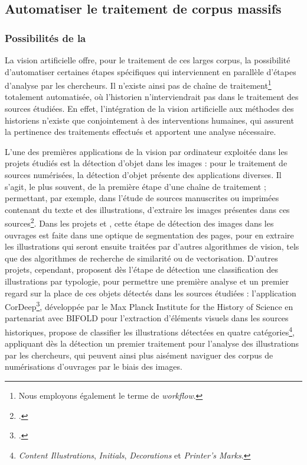 \subsection{Automatiser le traitement de corpus massifs}
    \subsubsection{Possibilités de la \cv}
	La vision artificielle offre, pour le traitement de ces larges corpus, la possibilité d'automatiser certaines étapes spécifiques qui interviennent en parallèle d'étapes d'analyse par les chercheurs. Il n'existe ainsi pas de chaîne de traitement\footnote{Nous employons également le terme de \textit{workflow}.} totalement automatisée, où l'historien n'interviendrait pas dans le traitement des sources étudiées. En effet, l'intégration de la vision artificielle aux méthodes des historiens n'existe que conjointement à des interventions humaines, qui assurent la pertinence des traitements effectués et apportent une analyse nécessaire.
	
	L'une des premières applications de la vision par ordinateur exploitée dans les projets étudiés est la détection d'objet dans les images : pour le traitement de sources numérisées, la détection d'objet présente des applications diverses. Il s'agit, le plus souvent, de la première étape d'une chaîne de traitement ; permettant, par exemple, dans l'étude de sources manuscrites ou imprimées contenant du texte et des illustrations, d'extraire les images présentes dans ces sources\footcite{buttnerCorDeepSacroboscoDataset2022}. Dans les projets \eida et \vhs, cette étape de détection des images dans les ouvrages est faite dans une optique de segmentation des pages, pour en extraire les illustrations qui seront ensuite traitées par d'autres algorithmes de vision, tels que des algorithmes de recherche de similarité ou de vectorisation. D'autres projets, cependant, proposent dès l'étape de détection une classification des illustrations par typologie, pour permettre une première analyse et un premier regard sur la place de ces objets détectés dans les sources étudiées : l'application CorDeep\footcite{CorDeep}, développée par le Max Planck Institute for the History of Science en partenariat avec BIFOLD pour l'extraction d'éléments visuels dans les sources historiques, propose de classifier les illustrations détectées en quatre catégories\footnote{\textit{Content Illustrations}, \textit{Initials}, \textit{Decorations} et \textit{Printer's Marks}.}, appliquant dès la détection un premier traitement pour l'analyse des illustrations par les chercheurs, qui peuvent ainsi plus aisément naviguer des corpus de numérisations d'ouvrages par le biais des images.
	
